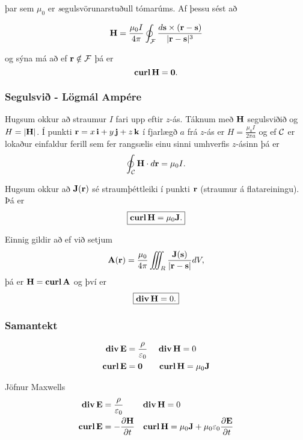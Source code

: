 þar sem $\mu_0$ er {\emph segulsvörunarstuðull} tómarúms. Af þessu sést að 


$$\Hv=\frac{\mu_0 I}{4\pi}\oint_{\cal F}
\frac{d\sv\times(\rv-\sv)}{|\rv-\sv|^3}$$

og sýna má að ef $\rv \notin \mathcal{F}$ þá er $$\curl \Hv = \mathbf{0}.$$




\subsubsection{Segulsvið \rtask{} - Lögmál Ampére}
 Hugsum okkur að straumur $I$ fari upp eftir $z$-ás.  Táknum með $\Hv$ segulsviðið og $H=|\Hv|$.  Í punkti  $\rv=x\,\iv+y\,\jv+z\,\kv$ í fjarlægð $a$ frá $z$-ás er $H=\frac{\mu_0 I}{2\pi a}$ og ef $\cal C$ er lokaður einfaldur ferill sem fer rangsælis einu sinni umhverfis $z$-ásinn þá er 
$$\oint_{\cal C} \Hv\cdot d\rv=\mu_0 I.$$

 Hugsum okkur að $\mathbf{J}(\rv)$ sé straumþéttleiki í punkti $\rv$ (straumur á flatareiningu).  Þá er 
$$ \boxed{\curl \Hv = \mu_0 \mathbf{J}.}$$

Einnig gildir að ef við setjum 
$$\Av(\rv)=\frac{\mu_0}{4\pi}\iiint_{R}
\frac{\mathbf{J}(\mathbf{s})}{|\rv-\sv|}dV,$$
þá er $\Hv=\curl \Av$  og því er $$\boxed{\dive \Hv=0.}$$


\subsubsection{Samantekt}
 \begin {align*}
  \dive \Ev &= \frac{\rho}{\epsilon_0} \quad~ \dive \Hv = 0 \\
  \curl \Ev &= \mathbf{0} \qquad \curl \Hv = \mu_0 \mathbf{J}
 \end {align*}

 Jöfnur Maxwells
 \begin {align*}
  \dive \Ev &= \frac{\rho}{\epsilon_0} \qquad ~ \dive \Hv = 0 \\
  \curl \Ev &= -\frac{\partial \Hv}{\partial t} \quad \curl \Hv = \mu_0 \mathbf{J} + \mu_0 \epsilon_0  \frac{\partial\Ev}{\partial t}
 \end {align*}






